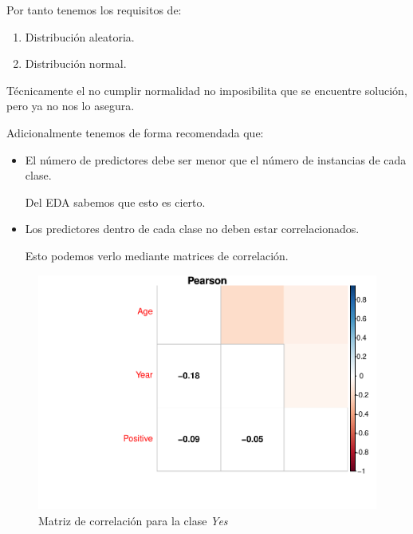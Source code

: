 Por tanto tenemos los requisitos de: 
\begin{enumerate}
    \item Distribución aleatoria.
    \item Distribución normal.
\end{enumerate}

Técnicamente el no cumplir normalidad no imposibilita que se encuentre solución, pero ya no nos lo asegura.

\vspace{\baselineskip}

Adicionalmente tenemos de forma recomendada que: 
\begin{itemize}
    \item El número de predictores debe ser menor que el número de instancias de cada clase. 
    
    Del EDA sabemos que esto es cierto.
    \item Los predictores dentro de cada clase no deben estar correlacionados.
    
    Esto podemos verlo mediante matrices de correlación.
\end{itemize}

\begin{figure}[H]\center\includegraphics[width=.9\linewidth]{img/Clasificacion_files/figure-latex/unnamed-chunk-25-1}\caption{Matriz de correlación para la clase \textit{Yes}}\end{figure}

